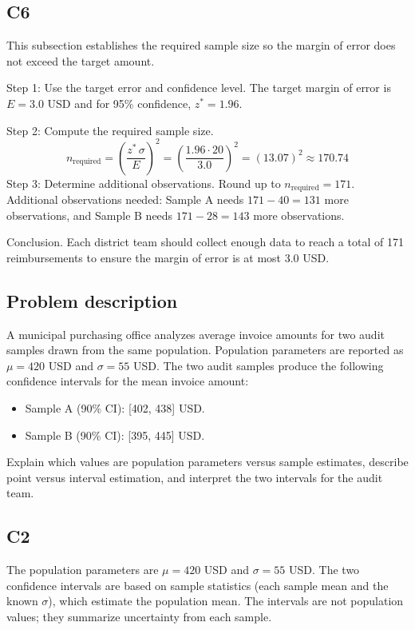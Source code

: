 \begin{ExamProblems}
		\subsection*{C6}
		This subsection establishes the required sample size so the margin of error does not exceed the target amount.

		Step 1: Use the target error and confidence level. The target margin of error is $E = 3.0$ USD and for 95\% confidence, $z^* = 1.96$.

		Step 2: Compute the required sample size.
		\[
		n_{\text{required}} = \left(\frac{z^*\,\sigma}{E}\right)^2
		= \left(\frac{1.96 \cdot 20}{3.0}\right)^2
		= \left(13.07\right)^2
		\approx 170.74
		\]
		Step 3: Determine additional observations. Round up to $n_{\text{required}} = 171$.
		Additional observations needed: Sample A needs $171 - 40 = 131$ more observations, and Sample B needs $171 - 28 = 143$ more observations.

		Conclusion. Each district team should collect enough data to reach a total of 171 reimbursements to ensure the margin of error is at most 3.0 USD.

		\newpage
		\item
		\subsection*{Problem description}
		A municipal purchasing office analyzes average invoice amounts for two audit samples drawn from the same population.
		Population parameters are reported as $\mu = 420$ USD and $\sigma = 55$ USD.
		The two audit samples produce the following confidence intervals for the mean invoice amount:

		\begin{itemize}
			\item Sample A (90\% CI): [402, 438] USD.
			\item Sample B (90\% CI): [395, 445] USD.
		\end{itemize}

		Explain which values are population parameters versus sample estimates, describe point versus interval estimation, and interpret the two intervals for the audit team.

		\subsection*{C2}
		The population parameters are $\mu = 420$ USD and $\sigma = 55$ USD. The two confidence intervals are based on sample statistics (each sample mean and the known $\sigma$), which estimate the population mean. The intervals are not population values; they summarize uncertainty from each sample.


\end{ExamProblems}
